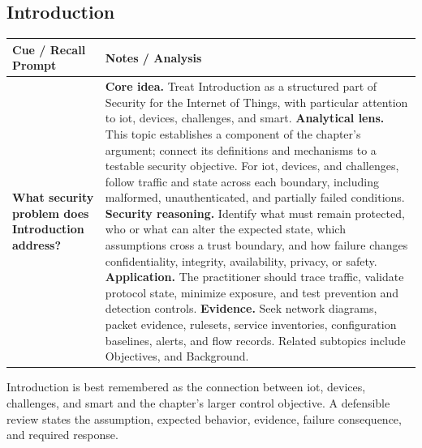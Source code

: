 \documentclass[11pt]{article}
\newcommand{\CornellHeader}{%
\rowcolor{Navy}\color{white}\bfseries Cue / Recall Prompt & \color{white}\bfseries Notes / Analysis\\\hline}
\newcommand{\CornellRow}[2]{%
\cellcolor{CueGray}\RaggedRight\textbf{#1} & \RaggedRight #2\\\hline}
\begin{document}
\subsection*{Introduction}
\begin{longtable}{>{\RaggedRight\arraybackslash}p{}|>{\RaggedRight\arraybackslash}p{}}
\CornellHeader
\CornellRow{What security problem does Introduction address?}{\textbf{Core idea.} Treat Introduction as a structured part of Security for the Internet of Things, with particular attention to iot, devices, challenges, and smart. \textbf{Analytical lens.} This topic establishes a component of the chapter's argument; connect its definitions and mechanisms to a testable security objective. For iot, devices, and challenges, follow traffic and state across each boundary, including malformed, unauthenticated, and partially failed conditions. \textbf{Security reasoning.} Identify what must remain protected, who or what can alter the expected state, which assumptions cross a trust boundary, and how failure changes confidentiality, integrity, availability, privacy, or safety. \textbf{Application.} The practitioner should trace traffic, validate protocol state, minimize exposure, and test prevention and detection controls. \textbf{Evidence.} Seek network diagrams, packet evidence, rulesets, service inventories, configuration baselines, alerts, and flow records. Related subtopics include Objectives, and Background.}
\end{longtable}
\begin{topicsummary}
Introduction is best remembered as the connection between iot, devices, challenges, and smart and the chapter's larger control objective. A defensible review states the assumption, expected behavior, evidence, failure consequence, and required response.
\end{topicsummary}
\end{document}
